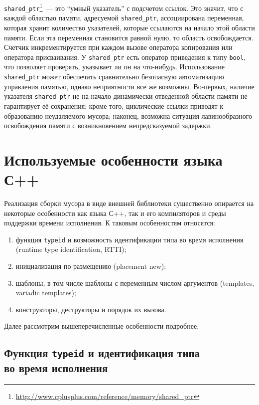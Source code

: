 \lstinline{shared_ptr}\footnote{\url{http://www.cplusplus.com/reference/memory/shared\_ptr}}~--- это ``умный указатель'' с подсчетом ссылок. Это значит, 
что с каждой областью памяти, адресуемой \lstinline{shared_ptr}, ассоциирована переменная, которая хранит количество указателей, которые ссылаются на начало
этой области памяти. Если эта переменная становится равной нулю, то область освобождается. Счетчик инкрементируется при каждом вызове оператора копирования 
или оператора присваивания. У \lstinline{shared_ptr} есть оператор приведения к типу \lstinline{bool}, что позволяет проверять, указывает ли он на что-нибудь.
Использование \lstinline{shared_ptr} может обеспечить сравнительно безопасную автоматизацию управления памятью, однако неприятности все же возможны. Во-первых,
наличие указателя \lstinline{shared_ptr} не на начало динамически отведенной области памяти не гарантирует её сохранения; кроме того, циклические
ссылки приводят к образованию неудаляемого мусора; наконец, возможна ситуация лавинообразного освобождения памяти с возникновением непредсказуемой
задержки.

\section{Используемые особенности языка С++}

Реализация сборки мусора в виде внешней библиотеки существенно опирается 
на некоторые особенности как языка С++, так и его компиляторов и среды поддержки времени 
исполнения. К таковым особенностям относятся:

\begin{enumerate}
\item функция \lstinline{typeid} и возможность идентификации типа во время исполнения (runtime type identification, RTTI);
\item инициализация по размещению (placement new);
\item шаблоны, в том числе шаблоны с переменным числом аргументов (templates, variadic templates);
\item конструкторы, деструкторы и порядок их вызова.
\end{enumerate}

Далее рассмотрим вышеперечисленные особенности подробнее.

\subsection{Функция \lstinline{typeid} и идентификация типа\\
во время исполнения} 

